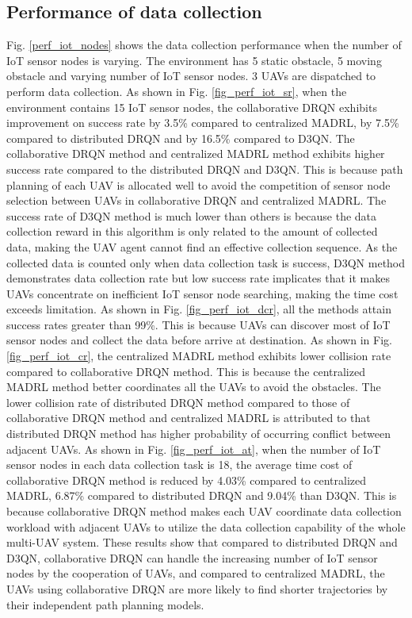 \documentclass[journal]{IEEEtran}
\begin{document}
\subsection{Performance of data collection}
Fig. \ref{perf_iot_nodes} shows the data collection performance when the number of IoT sensor nodes is varying. The environment has 5 static obstacle, 5 moving obstacle and varying number of IoT sensor nodes. 3 UAVs are dispatched to perform data collection. As shown in Fig. \ref{fig_perf_iot_sr}, when the environment contains 15 IoT sensor nodes, the collaborative DRQN exhibits improvement on success rate by 3.5\% compared to centralized MADRL, by 7.5\% compared to distributed DRQN and by 16.5\% compared to D3QN. The collaborative DRQN method and centralized MADRL method exhibits higher success rate compared to the distributed DRQN and D3QN. This is because path planning of each UAV is allocated well to avoid the competition of sensor node selection between UAVs in collaborative DRQN and centralized MADRL. The success rate of D3QN method is much lower than others is because the data collection reward in this algorithm is only related to the amount of collected data, making the UAV agent cannot find an effective collection sequence. As the collected data is counted only when data collection task is success, D3QN method demonstrates data collection rate but low success rate implicates that it makes UAVs concentrate on inefficient IoT sensor node searching, making the time cost exceeds limitation. As shown in Fig. \ref{fig_perf_iot_dcr}, all the methods attain success rates greater than 99\%. This is because UAVs can discover most of IoT sensor nodes and collect the data before arrive at destination. As shown in Fig. \ref{fig_perf_iot_cr}, the centralized MADRL method exhibits lower collision rate compared to collaborative DRQN method. This is because the centralized MADRL method better coordinates all the UAVs to avoid the obstacles. The lower collision rate of distributed DRQN method compared to those of collaborative DRQN method and centralized MADRL is attributed to that distributed DRQN method has higher probability of occurring conflict between adjacent UAVs. As shown in Fig. \ref{fig_perf_iot_at}, when the number of IoT sensor nodes in each data collection task is 18, the average time cost of collaborative DRQN method is reduced by 4.03\% compared to centralized MADRL, 6.87\% compared to distributed DRQN and 9.04\% than D3QN. This is because collaborative DRQN method makes each UAV coordinate data collection workload with adjacent UAVs to utilize the data collection capability of the whole multi-UAV system. These results show that compared to distributed DRQN and D3QN, collaborative DRQN can handle the increasing number of IoT sensor nodes by the cooperation of UAVs, and compared to centralized MADRL, the UAVs using collaborative DRQN are more likely to find shorter trajectories by their independent path planning models. 
\end{document}
